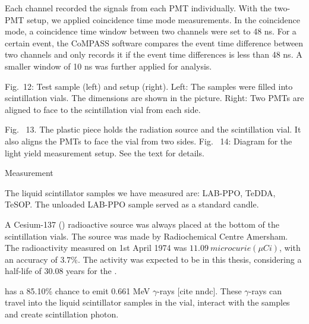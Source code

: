 Each channel recorded the signals from each PMT individually. With the two-PMT setup, we applied coincidence time mode measurements. In the coincidence mode, a coincidence time window between two channels were set to 48 ns. For a certain event, the CoMPASS software compares the event time difference between two channels and only records it if the event time differences is less than 48 ns. A smaller window of 10 ns was further applied for analysis.


Fig.~12: Test sample (left) and setup (right). Left: The samples were filled into scintillation vials. The dimensions are shown in the picture. Right: Two PMTs are aligned to face to the scintillation vial from each side.


Fig.~ 13. The plastic piece holds the radiation source and the scintillation vial.  It also aligns the PMTs to face the vial from two sides.
Fig.~ 14:  Diagram for the light yield measurement setup. See the text for details.

Measurement

The liquid scintillator samples we have measured are: LAB-PPO, TeDDA, TeSOP. The unloaded LAB-PPO sample served as a standard candle. 


A Cesium-137 () radioactive source was always placed at the bottom of the scintillation vials.
The source was made by Radiochemical Centre Amersham. The radioactivity measured on 1st April 1974 was $11.09~microcurie(\mu Ci)$, with an accuracy of $3.7\%$. The activity was expected to be 
in this thesis, considering a half-life of 30.08 years for the \cite{nndc}.




  has a 85.10\% chance to emit 0.661 MeV $\gamma$-rays [cite nndc]. These $\gamma$-rays can travel into the liquid scintillator samples in the vial, interact with the samples and create scintillation photon.

